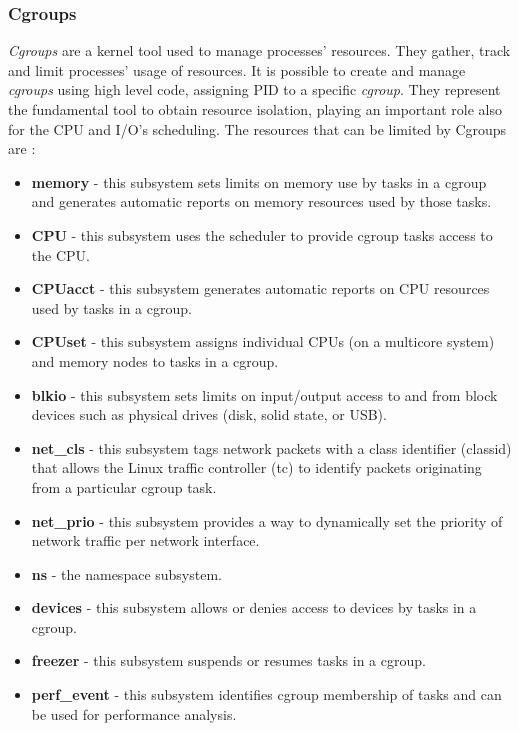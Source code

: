 \documentclass[a4paper,12pt]{article}
\begin{document}
\subsubsection{Cgroups}

\textit{Cgroups} are a kernel tool used to manage processes' resources. They
gather, track and limit processes' usage of resources. It is possible to create
and manage \textit{cgroups} using high level code, assigning PID to a specific
\textit{cgroup}. They represent the fundamental tool to obtain resource
isolation, playing an important role also for the CPU and I/O's scheduling. The
resources that can be limited by Cgroups
are \cite{red_hat_introduction_to_cgroups}:
\begin{itemize}
  \item \textbf{memory} - this subsystem sets limits on memory use by tasks in a
  cgroup and generates automatic reports on memory resources used by those
  tasks. 
  \item \textbf{CPU} - this subsystem uses the scheduler to provide cgroup tasks
  access to the CPU. 
  \item \textbf{CPUacct} - this subsystem generates automatic reports on CPU
  resources used by tasks in a cgroup. 
  \item \textbf{CPUset} - this subsystem assigns individual CPUs (on a multicore
  system) and memory nodes to tasks in a cgroup.
  \item \textbf{blkio} - this subsystem sets limits on input/output access to
  and from block devices such as physical drives (disk, solid state, or USB). 
  \item \textbf{net\_cls} - this subsystem tags network packets with a class
  identifier (classid) that allows the Linux traffic controller (tc) to identify
  packets originating from a particular cgroup task. 
  \item \textbf{net\_prio} - this subsystem provides a way to dynamically set
  the priority of network traffic per network interface. 
  \item \textbf{ns} - the namespace subsystem. 
  \item \textbf{devices} - this subsystem allows or denies access to devices by
  tasks in a cgroup. 
  \item \textbf{freezer} - this subsystem suspends or resumes tasks in a cgroup.
  \item \textbf{perf\_event} - this subsystem identifies cgroup membership of
  tasks and can be used for performance analysis. 
\end{itemize}   
\end{document}
